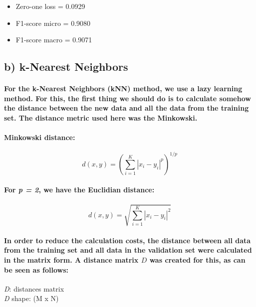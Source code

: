 \documentclass[a4paper]{article}    %
\begin{document}
\begin{itemize}
    \item Zero-one loss = 0.0929
    \item F1-score micro = 0.9080
    \item F1-score macro = 0.9071
\end{itemize}


\subsection{b) k-Nearest Neighbors}

\paragraph{For the k-Nearest Neighbors (kNN) method, we use a lazy learning method. For this, the first thing we should do is to calculate somehow the distance between the new data and all the data from the training set. The distance metric used here was the Minkowski.}

\paragraph{Minkowski distance:}

\[ d(x,y) = \left( \sum_{i=1}^{K} |x_i - y_i|^p \right)^{1/p} \]

\paragraph{For \textit{p = 2}, we have the Euclidian distance:}

\[ d(x,y) = \sqrt{\sum_{i=1}^{K} |x_i - y_i|^2} \]

\paragraph{In order to reduce the calculation costs, the distance between all data from the training set and all data in the validation set were calculated in the matrix form. A distance matrix $D$ was created for this, as can be seen as follows:}

\begin{center}
\textit{D}: distances matrix\\
\textit{D} shape: (M x N)
\end{center}
\end{document}
